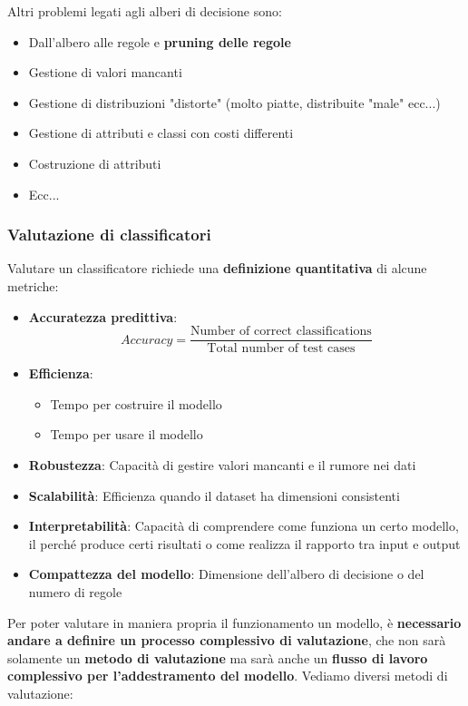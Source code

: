 \documentclass[12pt]{article}
\begin{document}
Altri problemi legati agli alberi di decisione sono:
\begin{itemize}
    \item Dall'albero alle regole e \textbf{pruning delle regole}
    \item Gestione di valori mancanti
    \item Gestione di distribuzioni "distorte" (molto piatte, distribuite "male" ecc...)
    \item Gestione di attributi e classi con costi differenti
    \item Costruzione di attributi
    \item Ecc...
\end{itemize}
\subsubsection{Valutazione di classificatori}
Valutare un classificatore richiede una \textbf{definizione quantitativa} di alcune metriche:
\begin{itemize}
    \item \textbf{Accuratezza predittiva}:
    $$Accuracy = \frac{\textrm{Number of correct classifications}}{\textrm{Total number of test cases}}$$
    \item \textbf{Efficienza}:
    \begin{itemize}
        \item Tempo per costruire il modello
        \item Tempo per usare il modello
    \end{itemize}
    \item \textbf{Robustezza}: Capacità di gestire valori mancanti e il rumore nei dati
    \item \textbf{Scalabilità}: Efficienza quando il dataset ha dimensioni consistenti
    \item \textbf{Interpretabilità}: Capacità di comprendere come funziona un certo modello, il perché produce certi risultati o come realizza il rapporto tra input e output
    \item \textbf{Compattezza del modello}: Dimensione dell'albero di decisione o del numero di regole
\end{itemize}
Per poter valutare in maniera propria il funzionamento un modello, è \textbf{necessario andare a definire un processo complessivo di valutazione}, che non sarà solamente
un \textbf{metodo di valutazione} ma sarà anche un \textbf{flusso di lavoro complessivo per l'addestramento del modello}.
Vediamo diversi metodi di valutazione: \newline
\end{document}
